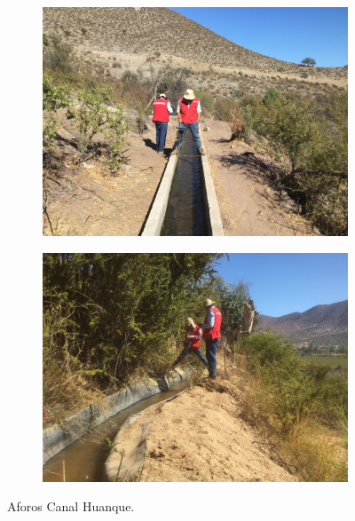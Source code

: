 \documentclass[]{article}
\begin{document}
\begin{figure}[H]
  \centering
\begin{subfigure}{.45\textwidth}
\hfill
  \includegraphics[angle= 180, width=\textwidth]{Foto/h3.jpg}
\end{subfigure}
\hfill
\begin{subfigure}{.45\textwidth}
\hfill
  \includegraphics[width=\textwidth]{Foto/h4.jpg} 
\end{subfigure}
\caption{Aforos Canal Huanque.}
\end{figure}
\end{document}
